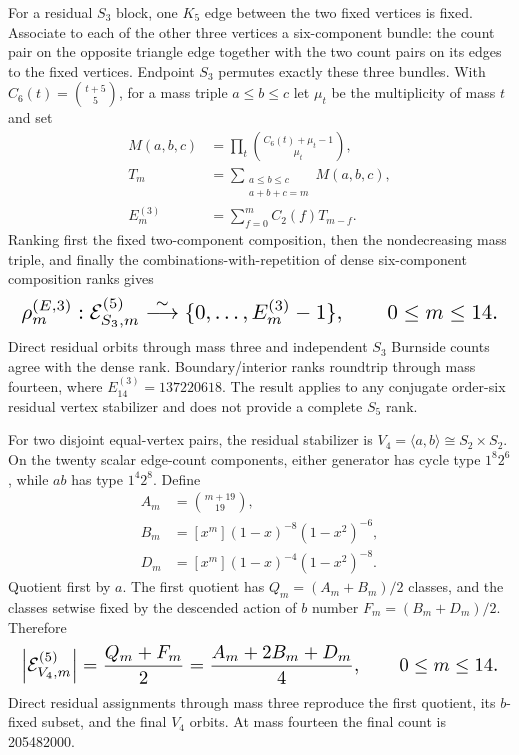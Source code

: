 \documentclass{article}
\newcommand{\fitmath}[1]{\resizebox{0.99\linewidth}{!}{$\displaystyle #1$}}
\begin{document}
For a residual $S_3$ block, one $K_5$ edge between the two fixed vertices is
fixed. Associate to each of the other three vertices a six-component bundle:
the count pair on the opposite triangle edge together with the two count pairs
on its edges to the fixed vertices. Endpoint $S_3$ permutes exactly these three
bundles. With $C_6(t)=\binom{t+5}{5}$, for a mass triple
$a\leq b\leq c$ let $\mu_t$ be the multiplicity of mass $t$ and set
\[
  \begin{aligned}
    M(a,b,c)&=\prod_t\binom{C_6(t)+\mu_t-1}{\mu_t},\\
    T_m&=\sum_{\substack{a\leq b\leq c\\a+b+c=m}}M(a,b,c),\\
    E^{(3)}_m&=\sum_{f=0}^{m}C_2(f)T_{m-f}.
  \end{aligned}
\]
Ranking first the fixed two-component composition, then the nondecreasing mass
triple, and finally the combinations-with-repetition of dense six-component
composition ranks gives
\begin{equation}
  \fitmath{%
    \rho^{(E,3)}_m:
      \mathcal E^{(5)}_{S_3,m}
      \overset{\sim}{\longrightarrow}\{0,\ldots,E^{(3)}_m-1\},
    \qquad 0\leq m\leq14.
  }
  \label{eq:optimization-crazy-preimage-cube-quintuple-s3-edge-ranking}
\end{equation}
Direct residual orbits through mass three and independent $S_3$ Burnside counts
agree with the dense rank. Boundary/interior ranks roundtrip through mass
fourteen, where $E^{(3)}_{14}=137220618$. The result applies to any conjugate
order-six residual vertex stabilizer and does not provide a complete $S_5$ rank.

For two disjoint equal-vertex pairs, the residual stabilizer is
$V_4=\langle a,b\rangle\cong S_2\times S_2$. On the twenty scalar edge-count
components, either generator has cycle type $1^8 2^6$, while $ab$ has type
$1^4 2^8$. Define
\[
  \begin{aligned}
    A_m&=\binom{m+19}{19},\\
    B_m&=[x^m](1-x)^{-8}(1-x^2)^{-6},\\
    D_m&=[x^m](1-x)^{-4}(1-x^2)^{-8}.
  \end{aligned}
\]
Quotient first by $a$. The first quotient has $Q_m=(A_m+B_m)/2$ classes, and
the classes setwise fixed by the descended action of $b$ number
$F_m=(B_m+D_m)/2$. Therefore
\begin{equation}
  \fitmath{%
    \left|\mathcal E^{(5)}_{V_4,m}\right|
      =\frac{Q_m+F_m}{2}
      =\frac{A_m+2B_m+D_m}{4},
    \qquad 0\leq m\leq14.
  }
  \label{eq:optimization-crazy-preimage-cube-quintuple-v4-edge-quotient}
\end{equation}
Direct residual assignments through mass three reproduce the first quotient,
its $b$-fixed subset, and the final $V_4$ orbits. At mass fourteen the final
count is 205482000.
\end{document}
